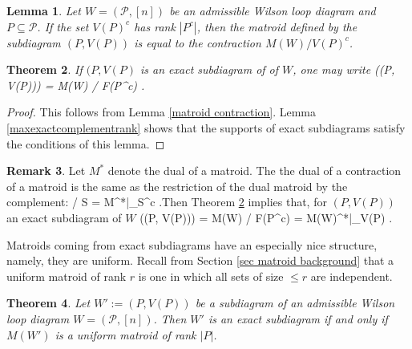 \documentclass[11pt]{article}
\def\bas #1\eas{\begin{align*} #1 \end{align*}}
\newcommand{\cP}{\mathcal{P}}
\newtheorem{thm}{Theorem}[section]
\newtheorem{lem}[thm]{Lemma}
\theoremstyle{remark}
\theoremstyle{definition}
\newtheorem{rmk}[thm]{Remark}
\begin{document}
\begin{lem} \label{contractsubdiaglem} \cite[Theorem 3.33]{wilsonloop} 
Let $W = (\cP, [n])$ be an admissible Wilson loop diagram and $P \subseteq \cP$. If the set $V(P)^c$ has rank $|P^c|$, then the matroid defined by the subdiagram $(P, V(P))$ is equal to the contraction $M(W)/V(P)^c$.
\end{lem}

\begin{thm} \label{exact diagrams contractions}
If $(P, V(P)$ is an exact subdiagram of of $W$, one may write \bas M\big((P, V(P))\big) = M(W)  / F(P^c) \;.\eas 
\end{thm}

\begin{proof}
This follows from Lemma \ref{matroid contraction}. Lemma \ref{maxexactcomplementrank} shows that the supports of exact subdiagrams satisfy the conditions of this lemma.
\end{proof}

\begin{rmk} \label{remark exact dual restiction}
Let $M^*$ denote the dual of a matroid. The the dual of a contraction of a matroid is the same as the restriction of the dual matroid by the complement: \bas M / S = M^*|_{S^c} \;.\eas Then Theorem \ref{exact diagrams contractions} implies that, for $(P, V(P))$ an exact subdiagram of $W$ \bas M\big((P, V(P))\big) = M(W)  / F(P^c) = M(W)^*|_{V(P)} \;.\eas
\end{rmk}

Matroids coming from exact subdiagrams have an especially nice structure, namely, they are uniform. Recall from Section \ref{sec matroid background} that a uniform matroid of rank $r$ is one in which all sets of size $ \leq r$ are independent.

\begin{thm} \label{exactuniformthm}
Let $W':= (P, V(P))$ be a subdiagram of an admissible Wilson loop diagram $W= (\cP, [n])$. Then $W'$ is an exact subdiagram if and only if $M(W')$ is a uniform matroid of rank $|P|$.
\end{thm}
\end{document}
